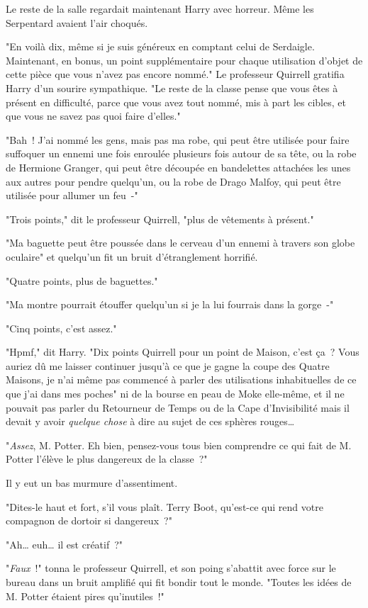 Le reste de la salle regardait maintenant Harry avec horreur. Même les Serpentard avaient l'air choqués.

"En voilà dix, même si je suis généreux en comptant celui de Serdaigle. Maintenant, en bonus, un point supplémentaire pour chaque utilisation d'objet de cette pièce que vous n'avez pas encore nommé." Le professeur Quirrell gratifia Harry d'un sourire sympathique. "Le reste de la classe pense que vous êtes à présent en difficulté, parce que vous avez tout nommé, mis à part les cibles, et que vous ne savez pas quoi faire d'elles."

"Bah~! J'ai nommé les gens, mais pas ma robe, qui peut être utilisée pour faire suffoquer un ennemi une fois enroulée plusieurs fois autour de sa tête, ou la robe de Hermione Granger, qui peut être découpée en bandelettes attachées les unes aux autres pour pendre quelqu'un, ou la robe de Drago Malfoy, qui peut être utilisée pour allumer un feu~-"

"Trois points," dit le professeur Quirrell, "plus de vêtements à présent."

"Ma baguette peut être poussée dans le cerveau d'un ennemi à travers son globe oculaire" et quelqu'un fit un bruit d'étranglement horrifié.

"Quatre points, plus de baguettes."

"Ma montre pourrait étouffer quelqu'un si je la lui fourrais dans la gorge~-"

"Cinq points, c'est assez."

"Hpmf," dit Harry. "Dix points Quirrell pour un point de Maison, c'est ça~? Vous auriez dû me laisser continuer jusqu'à ce que je gagne la coupe des Quatre Maisons, je n'ai même pas commencé à parler des utilisations inhabituelles de ce que j'ai dans mes poches" ni de la bourse en peau de Moke elle-même, et il ne pouvait pas parler du Retourneur de Temps ou de la Cape d'Invisibilité mais il devait y avoir \emph{quelque chose} à dire au sujet de ces sphères rouges…

"\emph{Assez}, M. Potter. Eh bien, pensez-vous tous bien comprendre ce qui fait de M. Potter l'élève le plus dangereux de la classe~?"

Il y eut un bas murmure d'assentiment.

"Dites-le haut et fort, s'il vous plaît. Terry Boot, qu'est-ce qui rend votre compagnon de dortoir si dangereux~?"

"Ah… euh… il est créatif~?"

"\emph{Faux}~!" tonna le professeur Quirrell, et son poing s'abattit avec force sur le bureau dans un bruit amplifié qui fit bondir tout le monde. "Toutes les idées de M. Potter étaient pires qu'inutiles~!"

